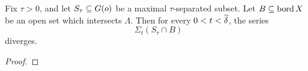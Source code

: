 


\begin{lemma}
\label{lemmatdivergent}
Fix $\tau > 0$, and let $S_\tau\subseteq G(o)$ be a maximal $\tau$-separated subset. Let $B\subseteq\operatorname{bord} X$ be an open set which intersects $\Lambda$. Then for every $0 < t < \widetilde\delta$, the series
\[
\Sigma_t(S_\tau\cap B)
\]
diverges.
\end{lemma}
\begin{proof}

%
%
%
%
%

\end{proof}
